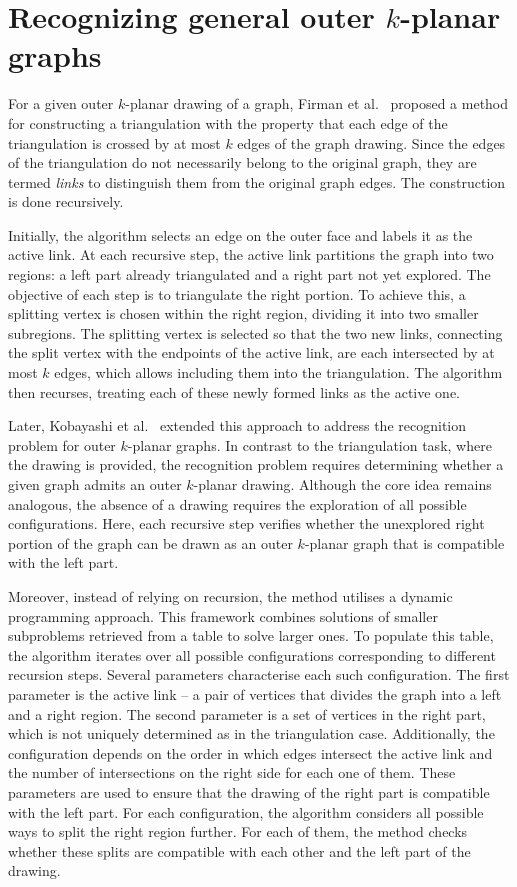 \section{Recognizing general outer \(k\)-planar graphs}\label{sec:recognizing-general-outer-(k)-planar-graphs}

For a given outer \(k\)-planar drawing of a graph, Firman et al.~\cite{triangulations} proposed a method for constructing a triangulation with the property that each edge of the triangulation is crossed by at most \(k\) edges of the graph drawing. Since the edges of the triangulation do not necessarily belong to the original graph, they are termed \emph{links} to distinguish them from the original graph edges. The construction is done recursively.

Initially, the algorithm selects an edge on the outer face and labels it as the active link. At each recursive step, the active link partitions the graph into two regions: a left part already triangulated and a right part not yet explored. The objective of each step is to triangulate the right portion. To achieve this, a splitting vertex is chosen within the right region, dividing it into two smaller subregions. The splitting vertex is selected so that the two new links, connecting the split vertex with the endpoints of the active link, are each intersected by at most \(k\) edges, which allows including them into the triangulation. The algorithm then recurses, treating each of these newly formed links as the active one.

Later, Kobayashi et al.~\cite{okp} extended this approach to address the recognition problem for outer \(k\)-planar graphs. In contrast to the triangulation task, where the drawing is provided, the recognition problem requires determining whether a given graph admits an outer \(k\)-planar drawing. Although the core idea remains analogous, the absence of a drawing requires the exploration of all possible configurations. Here, each recursive step verifies whether the unexplored right portion of the graph can be drawn as an outer \(k\)-planar graph that is compatible with the left part.

Moreover, instead of relying on recursion, the method utilises a dynamic programming approach. This framework combines solutions of smaller subproblems retrieved from a table to solve larger ones. To populate this table, the algorithm iterates over all possible configurations corresponding to different recursion steps. Several parameters characterise each such configuration. The first parameter is the active link -- a pair of vertices that divides the graph into a left and a right region. The second parameter is a set of vertices in the right part, which is not uniquely determined as in the triangulation case. Additionally, the configuration depends on the order in which edges intersect the active link and the number of intersections on the right side for each one of them. These parameters are used to ensure that the drawing of the right part is compatible with the left part. For each configuration, the algorithm considers all possible ways to split the right region further. For each of them, the method checks whether these splits are compatible with each other and the left part of the drawing.

